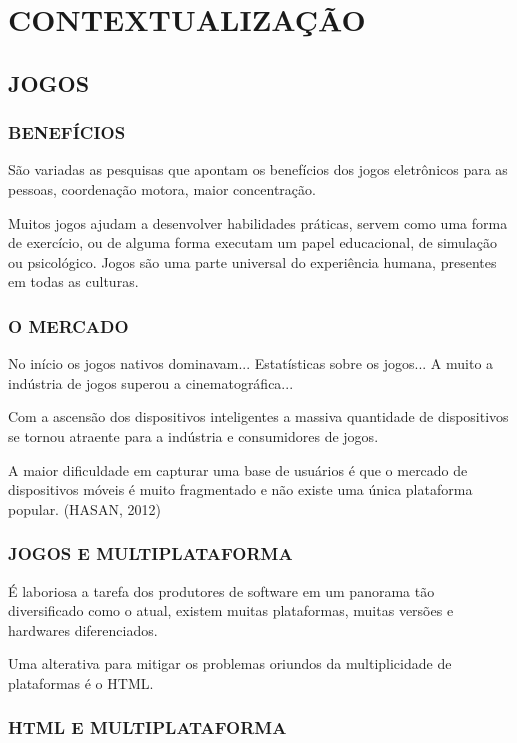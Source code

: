 \documentclass[11pt,a4paper]{article}
\author{Jean Carlo Machado}
\title{}
\begin{document}

\chapter{CONTEXTUALIZAÇÃO}
\section{JOGOS}

\subsection{BENEFÍCIOS}

São variadas as pesquisas que apontam os benefícios dos jogos
eletrônicos para as pessoas, coordenação motora, maior
concentração.

Muitos jogos ajudam a desenvolver habilidades práticas, servem como uma
forma de exercício, ou de alguma forma executam um papel educacional,
de simulação ou psicológico. Jogos são uma parte universal do
experiência humana, presentes em todas as culturas.

\subsection{O MERCADO}
No início os jogos nativos dominavam...
Estatísticas sobre os jogos...
A muito a indústria de jogos superou a cinematográfica...

Com a ascensão dos dispositivos inteligentes a massiva quantidade de
dispositivos se tornou atraente para a indústria e consumidores de
jogos.

A maior dificuldade em capturar uma base de usuários é que o mercado
de dispositivos móveis é muito fragmentado e não existe uma única
plataforma popular. (HASAN, 2012)

\subsection{JOGOS E MULTIPLATAFORMA}

É laboriosa a tarefa dos produtores de software em um panorama tão
diversificado como o atual, existem muitas plataformas, muitas versões
e hardwares diferenciados.

Uma alterativa para mitigar os problemas oriundos da multiplicidade de
plataformas é o HTML.

\subsection{HTML E MULTIPLATAFORMA}
\end{document}
